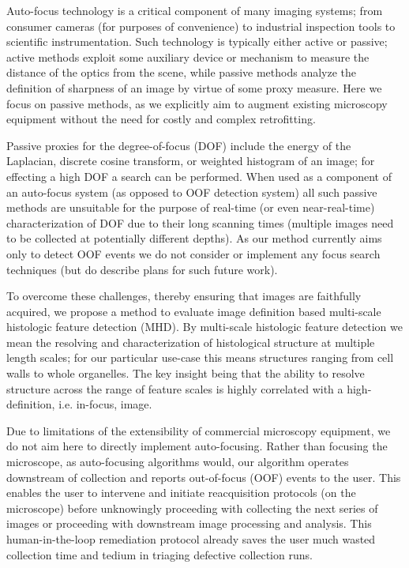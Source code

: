 \documentclass[sigconf,nonacm]{acmart}
\begin{document}
Auto-focus technology is a critical component of many imaging systems; from consumer cameras (for purposes of convenience) to industrial inspection tools to scientific instrumentation.
Such technology is typically either active or passive; active methods exploit some auxiliary device or mechanism to measure the distance of the optics from the scene, while passive methods analyze the definition of sharpness of an image by virtue of some proxy measure. 
Here we focus on passive methods, as we explicitly aim to augment existing microscopy equipment without the need for costly and complex retrofitting.

Passive proxies for the degree-of-focus (DOF) include the energy of the Laplacian, discrete cosine transform, or weighted histogram of an image; for effecting a high DOF a search can be performed.
When used as a component of an auto-focus system (as opposed to OOF detection system) all such passive methods are unsuitable for the purpose of real-time (or even near-real-time) characterization of DOF due to their long scanning times (multiple images need to be collected at potentially different depths).
As our method currently aims only to detect OOF events we do not consider or implement any focus search techniques (but do describe plans for such future work).

To overcome these challenges, thereby ensuring that images are faithfully acquired, we propose a method to evaluate image definition based multi-scale histologic feature detection (MHD). 
By multi-scale histologic feature detection we mean the resolving and characterization of histological structure at multiple length scales; for our particular use-case this means structures ranging from cell walls to whole organelles.
The key insight being that the ability to resolve structure across the range of feature scales is highly correlated with a high-definition, i.e. in-focus, image.

Due to limitations of the extensibility of commercial microscopy equipment, we do not aim here to directly implement auto-focusing.
Rather than focusing the microscope, as auto-focusing algorithms would, our algorithm operates downstream of collection and reports out-of-focus (OOF) events to the user. 
This enables the user to intervene and initiate reacquisition protocols (on the microscope) before unknowingly proceeding with collecting the next series of images or proceeding with downstream image processing and analysis. 
This human-in-the-loop remediation protocol already saves the user much wasted collection time and tedium in triaging defective collection runs.
\end{document}
